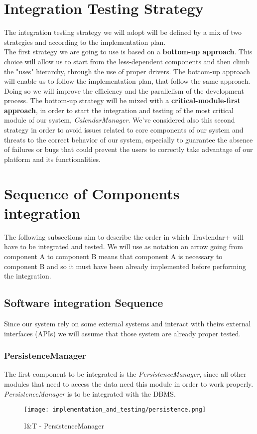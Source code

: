 \section{Integration Testing Strategy}
The integration testing strategy we will adopt will be defined by a mix of two strategies and according to the  implementation plan. \\
The first strategy we are going to use is based on a \textbf{bottom-up approach}. This choice will allow us to start from the less-dependent components and then climb the "uses" hierarchy, through the use of proper drivers. The bottom-up approach will enable us to follow the implementation plan, that follow the same approach. Doing so we will improve the efficiency and the parallelism of the development process. \newline
The bottom-up strategy will be mixed with a \textbf{critical-module-first approach}, in order to start the integration and testing of the most critical module of our system, \textit{CalendarManager}. We've considered also this second strategy in order to avoid issues related to core components of our system and threats to the correct behavior of our system, especially to guarantee the absence of failures or bugs that could prevent the users to correctly take advantage of our platform and its functionalities.

\section{Sequence of Components integration}
The following subsections aim to describe the order in which Travlendar+ will have to be integrated and tested. We will use as notation an arrow going from component A to component B means that component A is necessary to component B and so it must have been already implemented before performing the integration.

\subsection{Software integration Sequence}
Since our system rely on some external systems and interact with theirs external interfaces (APIs) we will assume that those system are already proper tested.
\subsubsection{PersistenceManager}
The first component to be integrated is the \textit{PersistenceManager}, since all other modules that need to access the data need this module in order to work properly. \textit{PersistenceManager} is to be integrated with the DBMS.
\begin{figure}[H]
	\begin{center}
		\texttt{[image: implementation\_and\_testing/persistence.png]}
	\end{center}
	\caption{I\&T - PersistenceManager}
\end{figure}

